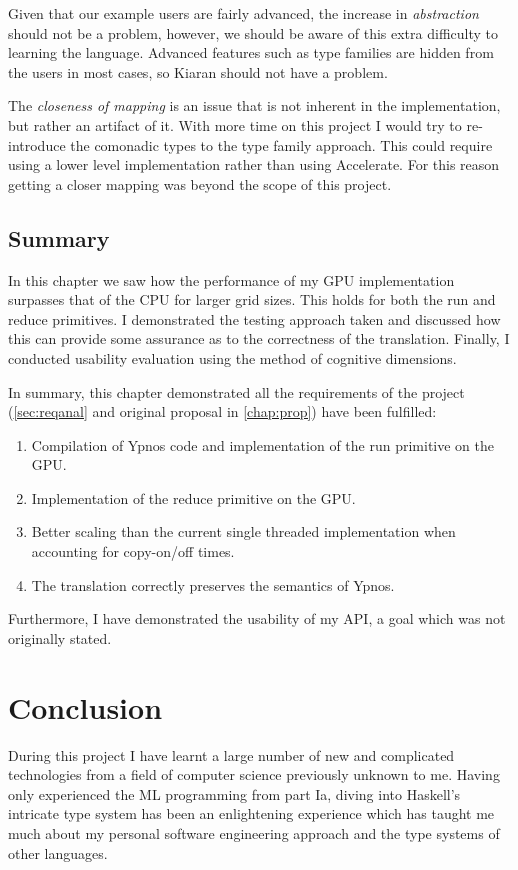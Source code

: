 \documentclass[
    12pt,
    a4paper,
    twoside,
    openright,
    ]{scrbook}
\begin{document}
Given that our example users are fairly advanced, the increase in
\emph{abstraction} should not be a problem, however, we should be aware of this
extra difficulty to learning the language. Advanced features such as type
families are hidden from the users in most cases, so Kiaran should not have a
problem.

The \emph{closeness of mapping} is an issue that is not inherent in the
implementation, but rather an artifact of it. With more time on this
project I would try to re-introduce the comonadic types to the type
family approach. This could require using a lower level implementation
rather than using Accelerate. For this reason getting a closer mapping
was beyond the scope of this project.

\section{Summary}

In this chapter we saw how the performance of my GPU implementation surpasses
that of the CPU for larger grid sizes. This holds for both the run and reduce
primitives. I demonstrated the testing approach taken and discussed how this can
provide some assurance as to the correctness of the translation. Finally, I
conducted usability evaluation using the method of cognitive dimensions.

In summary, this chapter demonstrated all the requirements of the project
(\autoref{sec:reqanal} and original proposal in \autoref{chap:prop}) have been
fulfilled:
\begin{enumerate}
\item Compilation of Ypnos code and implementation of the run primitive on the
  GPU.
\item Implementation of the reduce primitive on the GPU.
\item Better scaling than the current single threaded implementation when
  accounting for copy-on/off times.
\item The translation correctly preserves the semantics of Ypnos.
\end{enumerate}

Furthermore, I have demonstrated the usability of my API, a goal which was not
originally stated.

\chapter{Conclusion}

During this project I have learnt a large number of new and complicated
technologies from a field of computer science previously unknown to me. Having
only experienced the ML programming from part Ia, diving into Haskell's
intricate type system has been an enlightening experience which has taught me
much about my personal software engineering approach and the type systems of
other languages.
\end{document}
